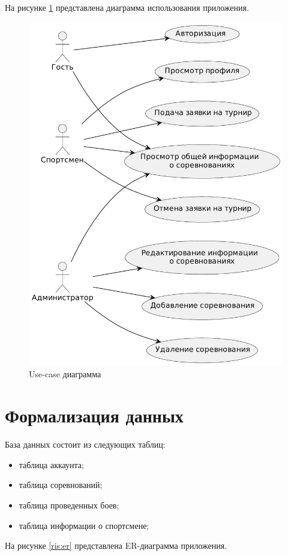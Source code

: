 На рисунке \ref{ris:usecase} представлена диаграмма использования приложения.

\begin{figure}[H]
	\includegraphics[width=0.6\columnwidth]{assets/out/usecase/usecase.pdf}
	\centering
	\caption{Use-case диаграмма}
	\label{ris:usecase}
\end{figure}

\section{Формализация данных}

База данных состоит из следующих таблиц:

\begin{itemize}
	\item таблица аккаунта;
	\item таблица соревнований;
	\item таблица проведенных боев;
	\item таблица информации о спортсмене;
\end{itemize}

На рисунке \ref{ris:er} представлена ER-диаграмма приложения.

